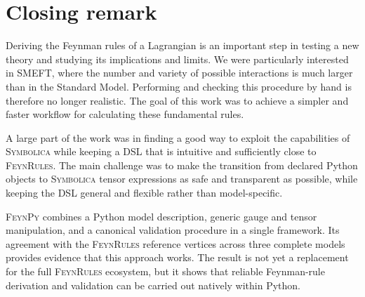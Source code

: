 \section{Closing remark}
\label{sec:conclusion-closing}

Deriving the Feynman rules of a Lagrangian is an important step in testing a new theory and studying its implications and limits. We were particularly interested in SMEFT, where the number and variety of possible interactions is much larger than in the Standard Model. Performing and checking this procedure by hand is therefore no longer realistic. The goal of this work was to achieve a simpler and faster workflow for calculating these fundamental rules.

A large part of the work was in finding a good way to exploit the capabilities of \textsc{Symbolica} while keeping a DSL that is intuitive and sufficiently close to \textsc{FeynRules}. The main challenge was to make the transition from declared Python objects to \textsc{Symbolica} tensor expressions as safe and transparent as possible, while keeping the DSL general and flexible rather than model-specific.

\textsc{FeynPy} combines a Python model description, generic gauge and tensor manipulation, and a canonical validation procedure in a single framework. Its agreement with the \textsc{FeynRules} reference vertices across three complete models provides evidence that this approach works. The result is not yet a replacement for the full \textsc{FeynRules} ecosystem, but it shows that reliable Feynman-rule derivation and validation can be carried out natively within Python.
